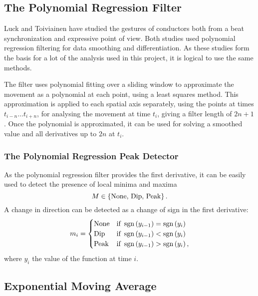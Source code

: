 \subsection{The Polynomial Regression Filter}
\label{sec:polynomial_regression_filter}

Luck and Toiviainen have studied the gestures of conductors
both from a beat synchronization \cite{luck2006}
and expressive \cite{luck2010} point of view.
Both studies used polynomial regression filtering
for data smoothing and differentiation.
As these studies form the basis for a lot
of the analysis used in this project,
it is logical to use the same methods.

The filter uses polynomial fitting
over a sliding window to approximate the movement
as a polynomial at each point,
using a least squares method.
This approximation is applied to each spatial axis separately,
using the points at times $t_{i-n} \ldots t_{i+n}$,
for analysing the movement at time $t_i$,
giving a filter length of $2n + 1$.
Once the polynomial is approximated,
it can be used for solving a smoothed value and
all derivatives up to $2n$ at $t_i$.

\subsubsection*{The Polynomial Regression Peak Detector}

As the polynomial regression filter provides the first derivative,
it can be easily used to detect the presence of local minima and maxima
\[
M \in \left \lbrace \mathrm{None}, \, \mathrm{Dip}, \, \mathrm{Peak} \right \rbrace .
\]
A change in direction can be detected as a change of sign in the first derivative:
\begin{equation}
m_i =
\begin{cases}
\mathrm{None} & \text{if } \operatorname{sgn} \left( y_{i-1} \right ) = \operatorname{sgn} \left( y_{i} \right ) \\
\mathrm{Dip} & \text{if } \operatorname{sgn} \left( y_{i-1} \right ) < \operatorname{sgn} \left( y_{i} \right ) \\
\mathrm{Peak} & \text{if } \operatorname{sgn} \left( y_{i-1} \right ) > \operatorname{sgn} \left( y_{i} \right ) ,
\end{cases}
\end{equation}
where $y_i$ the value of the function at time $i$.

\subsection{Exponential Moving Average}

